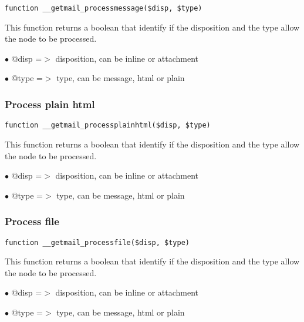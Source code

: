 \documentclass[a4paper]{article}
\begin{document}
\begin{lstlisting}
function __getmail_processmessage($disp, $type)
\end{lstlisting}

This function returns a boolean that identify if the disposition and the type
allow the node to be processed.

\begin{compactitem}
\item[\color{myblue}$\bullet$] @disp =$>$ disposition, can be inline or attachment
\item[\color{myblue}$\bullet$] @type =$>$ type, can be message, html or plain
\end{compactitem}

\hypertarget{toc77}{}
\subsubsection{Process plain html}

\begin{lstlisting}
function __getmail_processplainhtml($disp, $type)
\end{lstlisting}

This function returns a boolean that identify if the disposition and the type
allow the node to be processed.

\begin{compactitem}
\item[\color{myblue}$\bullet$] @disp =$>$ disposition, can be inline or attachment
\item[\color{myblue}$\bullet$] @type =$>$ type, can be message, html or plain
\end{compactitem}

\hypertarget{toc78}{}
\subsubsection{Process file}

\begin{lstlisting}
function __getmail_processfile($disp, $type)
\end{lstlisting}

This function returns a boolean that identify if the disposition and the type
allow the node to be processed.

\begin{compactitem}
\item[\color{myblue}$\bullet$] @disp =$>$ disposition, can be inline or attachment
\item[\color{myblue}$\bullet$] @type =$>$ type, can be message, html or plain
\end{compactitem}
\end{document}
